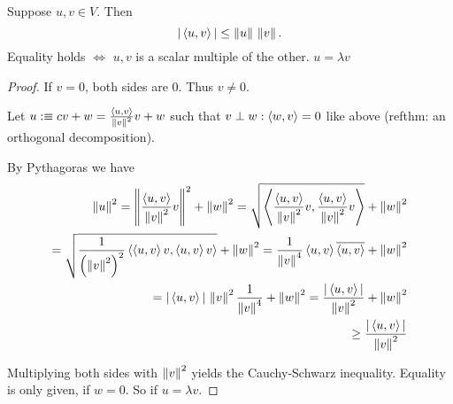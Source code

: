 \begin{thm}
  Suppose $u,v \in V$. Then
  \begin{equation}
    |\ip{u}{v}| \leq \norm{u} \, \norm{v}.
  \end{equation}
  Equality holds $\iff$ $u,v$ is a scalar multiple of the other. $u=\lambda v$
\end{thm}
\begin{proof}
  If $v=0$, both sides are $0$. Thus $v\neq0 $.
  
  Let $u :\equiv cv+w = \frac{\ip{u}{v}}{\norm{v}^2} v + w$ such that $v\perp w: \ip{w}{v} = 0$ like above (ref{thm: an orthogonal decomposition}). 
  
  By Pythagoras we have
  \begin{equation}
    \begin{aligned}
      \norm{u}^2 
      = \norm{ \frac{\ip{u}{v}}{\norm{v}^2} v}^2 + \norm{w}^2 
      = \sqrt{ \ip{\frac{\ip{u}{v}}{\norm{v}^2}  v}{\frac{\ip{u}{v}}{\norm{v}^2} v}} + \norm{w}^2 \\
      = \sqrt{ \frac{1}{ \left(\norm{v}^2 \right  )^2}\ip{\ip{u}{v}v}{\ip{u}{v}v}} + \norm{w}^2 
      = \frac{1}{\norm{v}^4} \ip{u}{v} \overline{\ip{u}{v}} + \norm{w}^2 \\
      = |\ip{u}{v}| \, \norm {v}^2 \frac{1}{\norm{v}^4} + \norm{w}^2
      = \frac{|\ip{u}{v}|}{\norm{v}^2} + \norm{w}^2 \\
      \geq \frac{|\ip{u}{v}|}{\norm{v}^2}
    \end{aligned}
  \end{equation} 
  
  Multiplying both sides with $\norm{v}^2$ yields the Cauchy-Schwarz inequality. Equality is only given, if $w=0$. So if $u=\lambda v$.
\end{proof}


